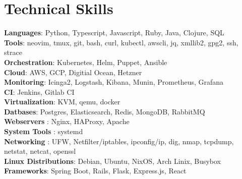 \documentclass[letterpaper,11pt]{article}
\begin{document}
\section{Technical Skills}
 \begin{itemize}[leftmargin=0.15in, label={}]
    \small{\item{
     \textbf{Languages}{: Python, Typescript, Javascript, Ruby, Java, Clojure, SQL } \\
     \textbf{Tools}{: neovim, tmux, git, bash, curl, kubectl, awscli, jq, xmllib2, gpg2, ssh, strace } \\
     \textbf{Orchestration}{: Kubernetes, Helm, Puppet, Ansible } \\
     \textbf{Cloud}{: AWS, GCP, Digitial Ocean, Hetzner } \\
     \textbf{Monitoring}{: Icinga2, Logstash, Kibana, Munin, Prometheus, Grafana } \\
     \textbf{CI}{: Jenkins, Gitlab CI } \\
     \textbf{Virtualization}{: KVM, qemu, docker } \\
     \textbf{Datbases}{: Postgres, Elasticsearch, Redis, MongoDB, RabbitMQ } \\
     \textbf{Webservers}{ : Nginx, HAProxy, Apache } \\
     \textbf{System Tools}{ : systemd } \\
     \textbf{Networking}{ : UFW, Netfilter/iptables, ipconfig/ip, dig, nmap, tcpdump, netstat, netcat, openssl } \\
     \textbf{Linux Distributions}{: Debian, Ubuntu, NixOS, Arch Linix, Busybox } \\
     \textbf{Frameworks}{: Spring Boot, Rails, Flask, Express.js, React } \\

    }}
 \end{itemize}
\end{document}
